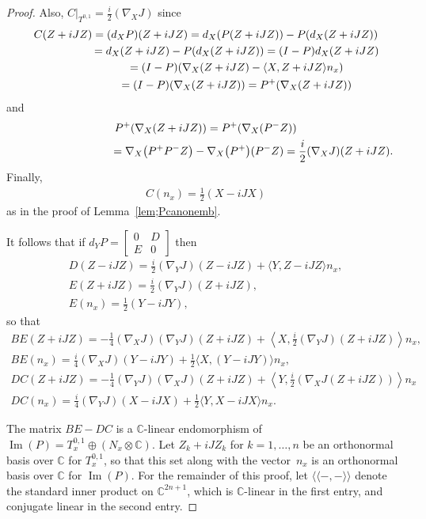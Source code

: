 \documentclass[10pt,a4paper]{amsart}
\numberwithin{equation}{section}
\newcommand{\CC}{\mathbb{C}}
\begin{document}
\begin{proof}
Also, $C \big|_{T^{0,1}} = \frac{i}{ 2} (\nabla_X J) $ since
\begin{gather*}
C(Z+iJZ) = (d_X P)(Z+iJZ) = d_X(P(Z + iJZ)) - P(d_X(Z+iJZ)) \\
\hphantom{C(Z+iJZ)}{} =d_X(Z + iJZ) - P(d_X(Z+iJZ)) = (I-P)d_X (Z+iJZ) \\
\hphantom{C(Z+iJZ)}{} = (I-P) ( \nabla_X (Z+iJZ) - \langle X,Z + iJZ \rangle n_x ) \\
\hphantom{C(Z+iJZ)}{} =(I-P) ( \nabla_X (Z+iJZ) ) = P^+ ( \nabla_X (Z+iJZ))
\end{gather*}
and
\begin{gather*}
 P^+ ( \nabla_X (Z+iJZ) ) = P^+ ( \nabla_X (P^- Z) ) \\
 \hphantom{P^+ ( \nabla_X (Z+iJZ) )}{} = \nabla_X \big( P^+ P^- Z\big)- \nabla_X\big(P^+\big) (P^-Z) = \frac{i}{2} (\nabla_X J) (Z + i J Z).
 \end{gather*}
 Finally,
\begin{gather*}
C(n_x) = \frac 1 2 (X - i J X)
\end{gather*}
as in the proof of Lemma~\ref{lem;Pcanonemb}.

It follows that if $d_YP =\left[
\begin{smallmatrix}
0 & D \\
E& 0
\end{smallmatrix}\right]$ then
\begin{gather*}
D(Z-iJZ) = \frac i 2 (\nabla_Y J) (Z-iJZ) + \langle Y , Z-iJZ \rangle n_x, \\
E (Z+iJZ) = \frac{i}{ 2} (\nabla_Y J)(Z+iJZ) ,\\
E(n_x) = \frac 1 2 (Y - i J Y),
\end{gather*}
so that
\begin{gather*}
BE (Z+iJZ) = -\frac{1}{4} (\nabla_X J) (\nabla_Y J)(Z+iJZ) + \left\langle X , \frac{i}{ 2} (\nabla_Y J)(Z+iJZ) \right\rangle n_x, \\
BE(n_x) = \frac i 4 (\nabla_X J) (Y - i J Y) + \frac 1 2 \langle X , (Y - i J Y) \rangle n_x, \\
DC(Z+iJZ) = -\frac{1}{4} (\nabla_Y J) (\nabla_X J)(Z+iJZ) + \left\langle Y , \frac{i}{ 2} ( \nabla_X J (Z+iJZ)) \right\rangle n_x \\
DC(n_x) = \frac i 4 (\nabla_Y J) (X-iJX) + \frac 1 2\langle Y , X-iJX \rangle n_x.
\end{gather*}

The matrix $BE-DC$ is a $\CC$-linear endomorphism of $\operatorname{Im}(P) = T^{0,1}_x \oplus (N_x \otimes \CC)$. Let $Z_k + i J Z_k$ for $k=1,\ldots ,n$ be an orthonormal basis over $\CC$ for $T^{0,1}_x$, so that this set along with the vector~$n_x$ is an orthonormal basis over $\CC$ for $\operatorname{Im}(P)$. For the remainder of this proof, let $\langle\langle - , - \rangle\rangle $ denote the standard inner product on $\CC^{2n+1}$, which is $\CC$-linear in the first entry, and conjugate linear in the second entry.


\end{proof}
\end{document}
